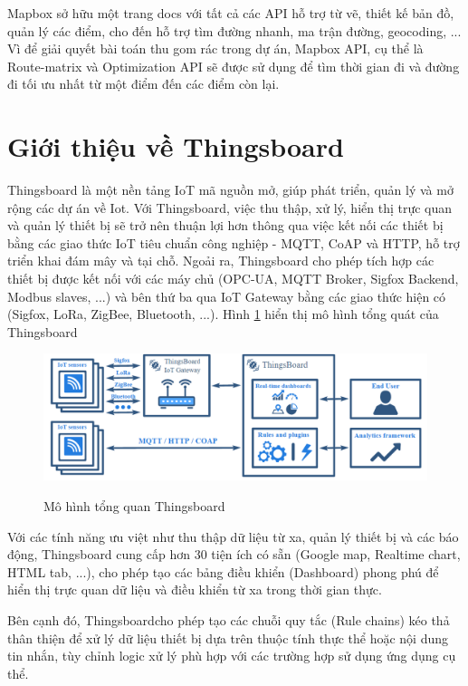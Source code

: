Mapbox sở hữu một trang docs với tất cả các API hỗ trợ từ vẽ, thiết kế bản đồ, quản lý các điểm, cho đến hỗ trợ tìm đường nhanh, ma trận đường, geocoding, ... Vì để giải quyết bài toán thu gom rác trong dự án, Mapbox API, cụ thể là Route-matrix và Optimization API sẽ được sử dụng để tìm thời gian đi và đường đi tối ưu nhất từ một điểm đến các điểm còn lại. 

\section{Giới thiệu về Thingsboard}
Thingsboard là một nền tảng IoT mã nguồn mở, giúp phát triển, quản lý và mở rộng các dự án về Iot. Với Thingsboard, việc thu thập, xử lý, hiển thị trực quan và quản lý thiết bị sẽ trở nên thuận lợi hơn thông qua việc kết nối các thiết bị bằng các giao thức IoT tiêu chuẩn công nghiệp - MQTT, CoAP và HTTP, hỗ trợ triển khai đám mây và tại chỗ. Ngoải ra, Thingsboard cho phép tích hợp các thiết bị được kết nối với các máy chủ (OPC-UA, MQTT Broker, Sigfox Backend, Modbus slaves, ...) và bên thứ ba qua IoT Gateway bằng các giao thức hiện có (Sigfox, LoRa, ZigBee, Bluetooth, ...). Hình \ref{fig:thingsboard_overall} hiển thị mô hình tổng quát của Thingsboard

\begin{figure}[h]
    \caption{Mô hình tổng quan Thingsboard}
    \includegraphics[width=\textwidth]{images/Khanh/Thingsboard/thingsboard_overall.png}
    \label{fig:thingsboard_overall}
\end{figure}

Với các tính năng ưu việt như thu thập dữ liệu từ xa, quản lý thiết bị và các báo động, Thingsboard cung cấp hơn 30 tiện ích có sẵn (Google map, Realtime chart, HTML tab, ...), cho phép tạo các bảng điều khiển (Dashboard) phong phú để hiển thị trực quan dữ liệu và điều khiển từ xa trong thời gian thực.

Bên cạnh đó, Thingsboardcho phép tạo các chuỗi quy tắc (Rule chains) kéo thả thân thiện để xử lý dữ liệu thiết bị dựa trên thuộc tính thực thể hoặc nội dung tin nhắn, tùy chỉnh logic xử lý phù hợp với các trường hợp sử dụng ứng dụng cụ thể. 



